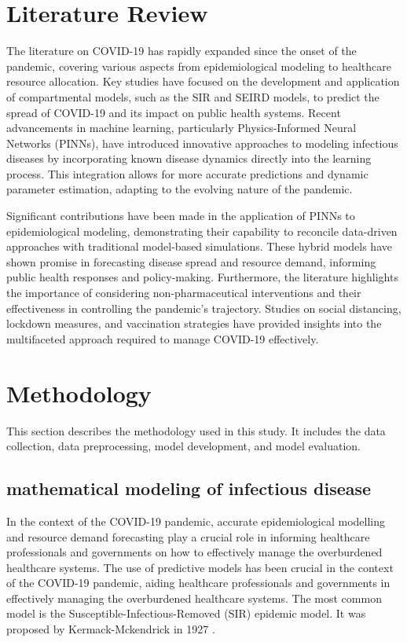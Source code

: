 \documentclass[12pt]{article}
\begin{document}
\section{Literature Review}

The literature on COVID-19 has rapidly expanded since the onset of the pandemic, covering various aspects from epidemiological modeling to healthcare resource allocation. Key studies have focused on the development and application of compartmental models, such as the SIR and SEIRD models, to predict the spread of COVID-19 and its impact on public health systems. Recent advancements in machine learning, particularly Physics-Informed Neural Networks (PINNs), have introduced innovative approaches to modeling infectious diseases by incorporating known disease dynamics directly into the learning process. This integration allows for more accurate predictions and dynamic parameter estimation, adapting to the evolving nature of the pandemic.

Significant contributions have been made in the application of PINNs to epidemiological modeling, demonstrating their capability to reconcile data-driven approaches with traditional model-based simulations. These hybrid models have shown promise in forecasting disease spread and resource demand, informing public health responses and policy-making. Furthermore, the literature highlights the importance of considering non-pharmaceutical interventions and their effectiveness in controlling the pandemic's trajectory. Studies on social distancing, lockdown measures, and vaccination strategies have provided insights into the multifaceted approach required to manage COVID-19 effectively.




\section{Methodology}
This section describes the methodology used in this study. It includes the data collection, data preprocessing, model development, and model evaluation.
\subsection{mathematical modeling of infectious disease}
In the context of the COVID-19 pandemic, accurate epidemiological modelling and resource demand forecasting play a crucial role in informing healthcare professionals and governments on how to effectively manage the overburdened healthcare systems. The use of predictive models has been crucial in the context of the COVID-19 pandemic, aiding healthcare professionals and governments in effectively managing the overburdened healthcare systems. The most common model is the Susceptible-Infectious-Removed (SIR) epidemic model. It was proposed by Kermack-Mckendrick in 1927 \cite{kermack1927contribution}. 
\end{document}
